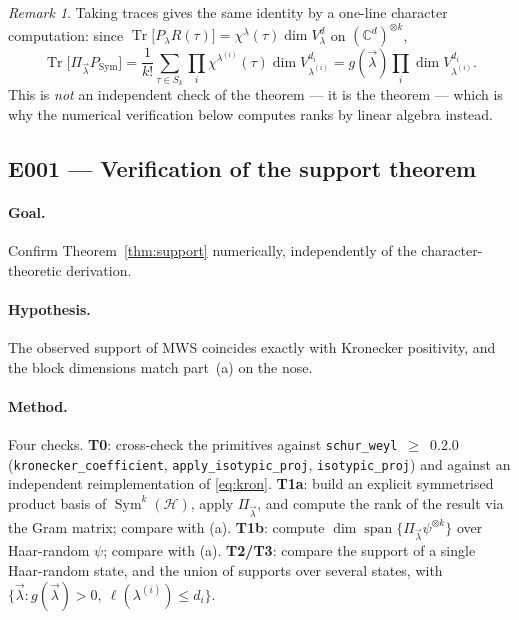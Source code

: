 \documentclass[11pt]{article}
\theoremstyle{definition}
\theoremstyle{remark}
\newtheorem{remark}[theorem]{Remark}
\newcommand{\bmlam}{\vec{\lambda}}
\newcommand{\Sym}{\operatorname{Sym}}
\newcommand{\Cx}{\mathbb{C}}
\newcommand{\Hil}{\mathcal{H}}
\begin{document}
\begin{remark}
Taking traces gives the same identity by a one-line character computation: since
$\operatorname{Tr}\bigl[P_\lambda R(\tau)\bigr] = \chi^\lambda(\tau)\dim V^d_\lambda$ on
$(\Cx^d)^{\otimes k}$,
\[
  \operatorname{Tr}\bigl[\Pi_{\bmlam} P_{\Sym}\bigr]
   = \frac{1}{k!}\sum_{\tau \in S_k} \prod_i \chi^{\lambda^{(i)}}(\tau)
     \dim V^{d_i}_{\lambda^{(i)}}
   = g(\bmlam)\prod_i \dim V^{d_i}_{\lambda^{(i)}} .
\]
This is \emph{not} an independent check of the theorem --- it is the theorem --- which
is why the numerical verification below computes ranks by linear algebra instead.
\end{remark}

\subsection{E001 --- Verification of the support theorem}

\paragraph{Goal.}
Confirm Theorem~\ref{thm:support} numerically, independently of the character-theoretic
derivation.

\paragraph{Hypothesis.}
The observed support of MWS coincides exactly with Kronecker positivity, and the
block dimensions match part~(a) on the nose.

\paragraph{Method.}
Four checks. \textbf{T0}: cross-check the primitives against
\texttt{schur\_weyl}~$\ge$~0.2.0 (\texttt{kronecker\_coefficient},
\texttt{apply\_isotypic\_proj}, \texttt{isotypic\_proj}) and against an independent
reimplementation of \eqref{eq:kron}. \textbf{T1a}: build an explicit symmetrised
product basis of $\Sym^k(\Hil)$, apply $\Pi_{\bmlam}$, and compute the rank of the
result via the Gram matrix; compare with (a). \textbf{T1b}: compute
$\dim\operatorname{span}\{\Pi_{\bmlam}\psi^{\otimes k}\}$ over Haar-random $\psi$;
compare with (a). \textbf{T2/T3}: compare the support of a single Haar-random state,
and the union of supports over several states, with
$\{\bmlam : g(\bmlam) > 0,\ \ell(\lambda^{(i)}) \le d_i\}$.
\end{document}
